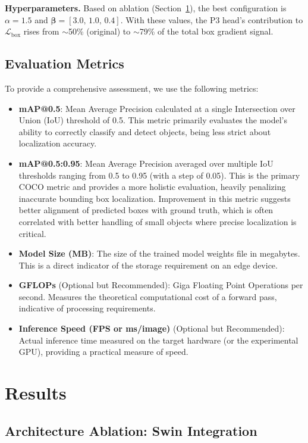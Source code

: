 \documentclass[conference]{IEEEtran}
\begin{document}
\textbf{Hyperparameters.}  Based on ablation (Section~\ref{sec:results}),
the best configuration is $\alpha = 1.5$ and
$\boldsymbol{\beta} = [3.0,\,1.0,\,0.4]$.
With these values, the P3 head's contribution to
$\mathcal{L}_{\text{box}}$ rises from $\sim$50\% (original) to $\sim$79\%
of the total box gradient signal.

\subsection{Evaluation Metrics}
To provide a comprehensive assessment, we use the following metrics:
\begin{itemize}
\item \textbf{mAP@0.5}: Mean Average Precision calculated at a single Intersection over Union (IoU) threshold of 0.5. This metric primarily evaluates the model's ability to correctly classify and detect objects, being less strict about localization accuracy.
\item \textbf{mAP@0.5:0.95}: Mean Average Precision averaged over multiple IoU thresholds ranging from 0.5 to 0.95 (with a step of 0.05). This is the primary COCO metric and provides a more holistic evaluation, heavily penalizing inaccurate bounding box localization. Improvement in this metric suggests better alignment of predicted boxes with ground truth, which is often correlated with better handling of small objects where precise localization is critical.
\item \textbf{Model Size (MB)}: The size of the trained model weights file in megabytes. This is a direct indicator of the storage requirement on an edge device.
\item \textbf{GFLOPs} (Optional but Recommended): Giga Floating Point Operations per second. Measures the theoretical computational cost of a forward pass, indicative of processing requirements.
\item \textbf{Inference Speed (FPS or ms/image)} (Optional but Recommended): Actual inference time measured on the target hardware (or the experimental GPU), providing a practical measure of speed.
\end{itemize}

\section{Results}
\label{sec:results}

\subsection{Architecture Ablation: Swin Integration}
\end{document}
